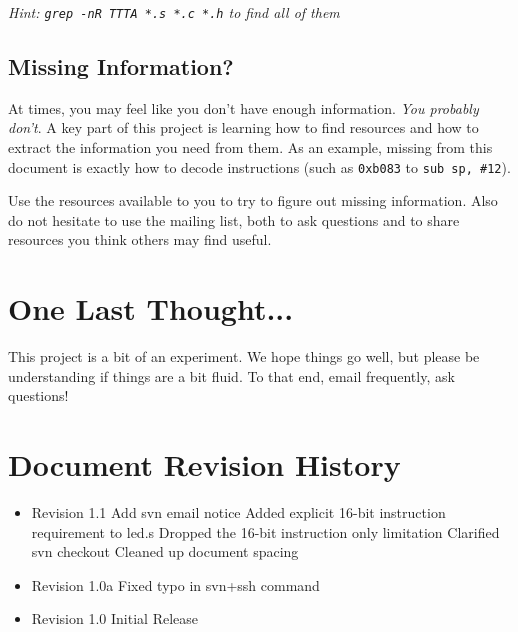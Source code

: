 \documentclass{article}
\begin{document}
\vspace{5mm}

{\em Hint: {\tt grep -nR TTTA *.s *.c *.h} to find all of them}

\subsection{Missing Information?}
At times, you may feel like you don't have enough information. {\em You
probably don't}. A key part of this project is learning how to find resources
and how to extract the information you need from them. As an example, missing
from this document is exactly how to decode instructions (such as {\tt 0xb083}
to {\tt sub sp, \#12}).

Use the resources available to you to try to figure out missing information.
Also do not hesitate to use the mailing list, both to ask questions and to
share resources you think others may find useful.

\section{One Last Thought...}
This project is a bit of an experiment. We hope things go well, but please be
understanding if things are a bit fluid. To that end, email frequently, ask
questions!

\pagebreak

\section{Document Revision History}

\begin{itemize}

\item Revision 1.1
\subitem Add svn email notice
\subitem Added explicit 16-bit instruction requirement to led.s
\subitem Dropped the 16-bit instruction only limitation
\subitem Clarified svn checkout
\subitem Cleaned up document spacing

\item Revision 1.0a
\subitem Fixed typo in svn+ssh command

\item Revision 1.0
\subitem Initial Release

\end{itemize}
\end{document}
